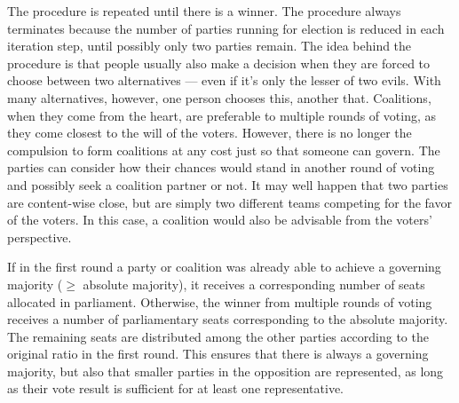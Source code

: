The procedure is repeated until there is a winner. The procedure always terminates
because the number of parties running for election is reduced in each iteration step,
until possibly only two parties remain. The idea behind the procedure is that
people usually also make a decision when they are forced to choose between two
alternatives --- even if it's only the lesser of two evils. With many
alternatives, however, one person chooses this, another that. Coalitions, when they
come from the heart, are preferable to multiple rounds of voting, as they come closest to the will of the voters. However,
there is no longer the compulsion to form coalitions at any cost just so that someone can govern.
The parties can consider how their chances would stand in another round of voting
and possibly seek a coalition partner or not. It may well happen that
two parties are content-wise close, but are simply two different teams competing
for the favor of the voters. In this case, a coalition would also be advisable from the voters' perspective.

If in the first round a party or coalition was already able to achieve a governing majority ($\geq$
absolute majority), it receives a corresponding number of seats allocated in parliament.
Otherwise, the winner from multiple rounds of voting receives a number of parliamentary seats
corresponding to the absolute majority. The remaining seats are distributed among the
other parties according to the original ratio in the first round. This
ensures that there is always a governing majority, but also that smaller parties in the
opposition are represented, as long as their vote result is sufficient for at least one representative.

\bigskip


